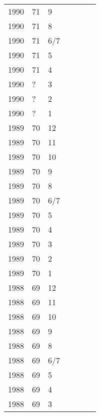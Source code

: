 \begin{longtable}{ |l|l|l|l|p{2.7cm}|l|p{2cm}| }
 1990 & 71 &     9 &         &                &  & \\
 1990 & 71 &     8 &         &                &  & \\
 1990 & 71 &   6/7 &         &                &  & \\
 1990 & 71 &     5 &         &                &   & \\
 1990 & 71 &     4 &         &                &  & \\
 1990 & ?  &     3 &         &                &  & \\
 1990 & ?  &     2 &         &                &  & \\
 1990 & ?  &     1 &         &                &  & \\
 1989 & 70 &    12 &         &                &   & \\
 1989 & 70 &    11 &         &                &  & \\
 1989 & 70 &    10 &         &                &  & \\
 1989 & 70 &     9 &         &                &  & \\
 1989 & 70 &     8 &         &                &  & \\
 1989 & 70 &   6/7 &         &                &  & \\
 1989 & 70 &     5 &         &                &  & \\
 1989 & 70 &     4 &         &                &  & \\
 1989 & 70 &     3 &         &                &  & \\
 1989 & 70 &     2 &         &                &  & \\
 1989 & 70 &     1 &         &                &  & \\
 1988 & 69 &    12 &         &                &  & \\
 1988 & 69 &    11 &         &                &  & \\
 1988 & 69 &    10 &         &                &  & \\
 1988 & 69 &     9 &         &                &  & \\
 1988 & 69 &     8 &         &                &  & \\
 1988 & 69 &   6/7 &         &                &  & \\
 1988 & 69 &     5 &         &                &  & \\
 1988 & 69 &     4 &         &                &  & \\
 1988 & 69 &     3 &         &                &  & \\

\end{longtable}
